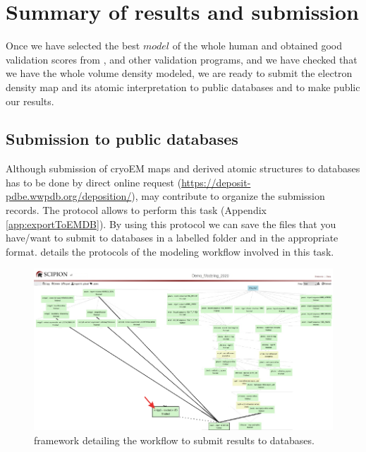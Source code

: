 \section{Summary of results and submission}

Once we have selected the best $model$ of the whole human  and obtained good validation scores from \emringer, \molprobity and other validation programs, and we have checked that we have the whole volume density modeled, we are ready to submit the electron density map and its atomic interpretation to public databases and to make public our results.\\

\subsection*{Submission to public databases}

Although submission of cryoEM maps and derived atomic structures to databases has to be done by direct online request (\url{https://deposit-pdbe.wwpdb.org/deposition/}), \scipion may contribute to organize the submission records. The protocol  allows to perform this task (Appendix \ref{app:exportToEMDB}). By using this protocol we can save the files that you have/want to submit to databases in a labelled folder and in the appropriate format.  details the protocols of the modeling \scipion workflow involved in this task.

 \begin{figure}[H]
  \centering 
  \captionsetup{width=.9\linewidth} 
  \includegraphics[width=1\textwidth]{Images/Fig78}
  \caption{\scipion framework detailing the workflow to submit \cryoEM results to databases.}
  \label{fig:scipion_workflow_submission}
  \end{figure}


